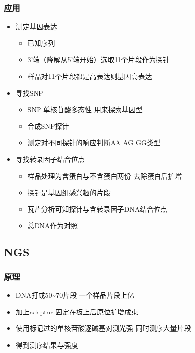\documentclass[]{book}
\providecommand{\tightlist}{%
  \setlength{\itemsep}{0pt}\setlength{\parskip}{0pt}}
\begin{document}
\hypertarget{ux5e94ux7528-1}{%
\subsubsection{应用}\label{ux5e94ux7528-1}}

\begin{itemize}
\item
  测定基因表达

  \begin{itemize}
  \tightlist
  \item
    已知序列
  \item
    3'端（降解从5'端开始）选取11个片段作为探针
  \item
    样品对11个片段都是高表达则基因高表达
  \end{itemize}
\item
  寻找SNP

  \begin{itemize}
  \tightlist
  \item
    SNP 单核苷酸多态性 用来探索基因型
  \item
    合成SNP探针
  \item
    测定对不同探针的响应判断AA AG GG类型
  \end{itemize}
\item
  寻找转录因子结合位点

  \begin{itemize}
  \tightlist
  \item
    样品处理为含蛋白与不含蛋白两份 去除蛋白后扩增
  \item
    探针是基因组感兴趣的片段
  \item
    瓦片分析可知探针与含转录因子DNA结合位点
  \item
    总DNA作为对照
  \end{itemize}
\end{itemize}

\hypertarget{ngs}{%
\subsection{NGS}\label{ngs}}

\hypertarget{ux539fux7406-1}{%
\subsubsection{原理}\label{ux539fux7406-1}}

\begin{itemize}
\tightlist
\item
  DNA打成50\textasciitilde{}70片段 一个样品片段上亿
\item
  加上adaptor 固定在板上后原位扩增成束
\item
  使用标记过的单核苷酸逐碱基对测光强 同时测序大量片段
\item
  得到测序结果与强度
\end{itemize}
\end{document}
